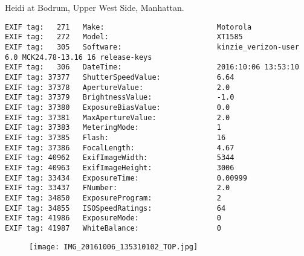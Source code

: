 \section{\protect{}}
\noindent Heidi at Bodrum, Upper West Side, Manhattan.
\noindent
\begin{lstlisting}
EXIF tag:   271   Make:                          Motorola
EXIF tag:   272   Model:                         XT1585
EXIF tag:   305   Software:                      kinzie_verizon-user 6.0 MCK24.78-13.16 16 release-keys
EXIF tag:   306   DateTime:                      2016:10:06 13:53:10
EXIF tag: 37377   ShutterSpeedValue:             6.64
EXIF tag: 37378   ApertureValue:                 2.0
EXIF tag: 37379   BrightnessValue:               -1.0
EXIF tag: 37380   ExposureBiasValue:             0.0
EXIF tag: 37381   MaxApertureValue:              2.0
EXIF tag: 37383   MeteringMode:                  1
EXIF tag: 37385   Flash:                         16
EXIF tag: 37386   FocalLength:                   4.67
EXIF tag: 40962   ExifImageWidth:                5344
EXIF tag: 40963   ExifImageHeight:               3006
EXIF tag: 33434   ExposureTime:                  0.00999
EXIF tag: 33437   FNumber:                       2.0
EXIF tag: 34850   ExposureProgram:               2
EXIF tag: 34855   ISOSpeedRatings:               64
EXIF tag: 41986   ExposureMode:                  0
EXIF tag: 41987   WhiteBalance:                  0

\end{lstlisting}
\clearpage
\begin{figure}
\raggedleft
\texttt{[image: IMG\_20161006\_135310102\_TOP.jpg]}
\end{figure}


\clearpage
